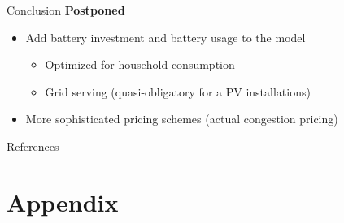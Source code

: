 \documentclass[10pt, aspectration=169]{beamer}
\begin{document}
\begin{frame}{Conclusion}
\textbf{Postponed}
\begin{itemize}
    \item Add battery investment and battery usage to the model 
    \begin{itemize}
        \item Optimized for household consumption 
        \item Grid serving (quasi-obligatory for a PV installations)
    \end{itemize}
    \item  More sophisticated pricing schemes (actual congestion pricing)
\end{itemize}

\end{frame}



\renewcommand{\bibfont}{\footnotesize}
\begin{frame}[allowframebreaks]{References}
\printbibliography

\end{frame}
\renewcommand{\bibfont}{\normalsize}

\section*{Appendix} 
\end{document}
